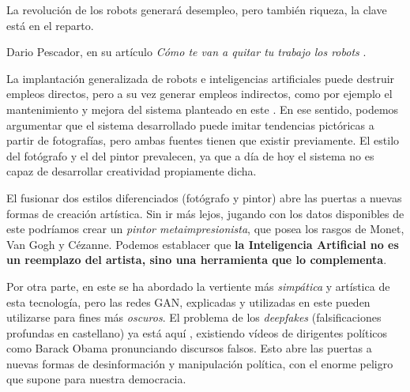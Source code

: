 \documentclass[../main.tex]{subfiles}
\begin{document}
\begin{center}
    \begin{minipage}{0.9\linewidth}
        \vspace{5pt}%
        {\small
            La revolución de los robots generará desempleo, pero también riqueza, la clave está en el reparto.
        }
        \begin{flushright}
           Dario Pescador, en su artículo \textit{Cómo te van a quitar tu trabajo los robots} \cite{Pescador2019}.
        \end{flushright}
        \vspace{3pt}%
    \end{minipage}
\end{center}


La implantación generalizada de robots e inteligencias artificiales puede destruir empleos directos, pero a su vez generar empleos indirectos, como por ejemplo el mantenimiento y mejora del sistema planteado en este \tfg. En ese sentido, podemos argumentar que el sistema desarrollado puede imitar tendencias pictóricas a partir de fotografías, pero ambas fuentes tienen que existir previamente. El estilo del fotógrafo y el del pintor prevalecen, ya que a día de hoy el sistema no es capaz de desarrollar creatividad propiamente dicha. \newline

El fusionar dos estilos diferenciados (fotógrafo y pintor) abre las puertas a nuevas formas de creación artística. Sin ir más lejos, jugando con los datos disponibles de este \tfg podríamos crear un \textit{pintor metaimpresionista}, que posea los rasgos de Monet, Van Gogh y Cézanne. Podemos establacer que \textbf{la Inteligencia Artificial no es un reemplazo del artista, sino una herramienta que lo complementa}. \newline

Por otra parte, en este \tfg se ha abordado la vertiente más \textit{simpática} y artística de esta tecnología, pero las redes GAN, explicadas y utilizadas en este \tfg pueden utilizarse para fines más \textit{oscuros}. El problema de los \textit{deepfakes} (falsificaciones profundas en castellano) ya está aquí \cite{IBMDeveloperAdvocateinSiliconValley2019}, existiendo vídeos de dirigentes políticos como Barack Obama pronunciando discursos falsos. Esto abre las puertas a nuevas formas de desinformación y manipulación política, con el enorme peligro que supone para nuestra democracia. \newline 
\end{document}
